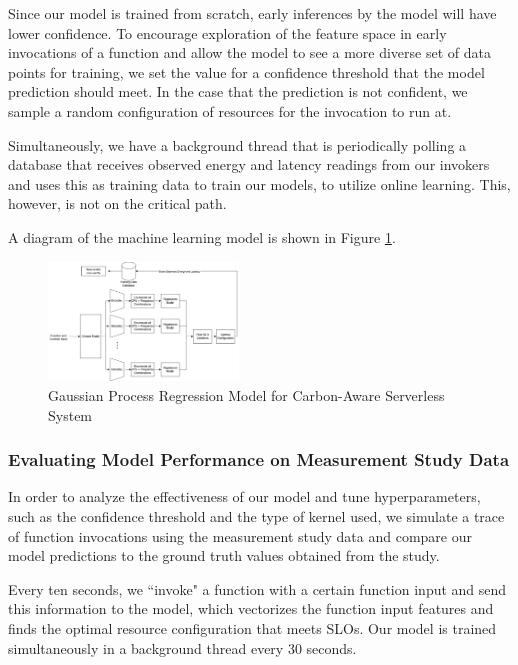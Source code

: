 \documentclass[times, 10pt,twocolumn]{article}
\begin{document}
Since our model is trained from scratch, early inferences by the model will have lower confidence. To encourage exploration of the feature space in early invocations of a function and allow the model to see a more diverse set of data points for training, we set the value for a confidence threshold that the model prediction should meet. In the case that the prediction is not confident, we sample a random configuration of resources for the invocation to run at. 

Simultaneously, we have a background thread that is periodically polling a database that receives observed energy and latency readings from our invokers and uses this as training data to train our models, to utilize online learning. This, however, is not on the critical path.



A diagram of the machine learning model is shown in Figure \ref{fig:ml_model}.

\begin{figure}[ht]
   \centering
   \includegraphics[width=0.45\textwidth]{imgs/ml_model.png}
   \caption{Gaussian Process Regression Model for Carbon-Aware Serverless System}
   \label{fig:ml_model}
 \end{figure}

 \subsubsection{Evaluating Model Performance on Measurement Study Data}
In order to analyze the effectiveness of our model and tune hyperparameters, such as the confidence threshold and the type of kernel used, we simulate a trace of function invocations using the measurement study data and compare our model predictions to the ground truth values obtained from the study.

Every ten seconds, we ``invoke" a function with a certain function input and send this information to the model, which vectorizes the function input features and finds the optimal resource configuration that meets SLOs. Our model is trained simultaneously in a background thread every 30 seconds. 
 
\end{document}
